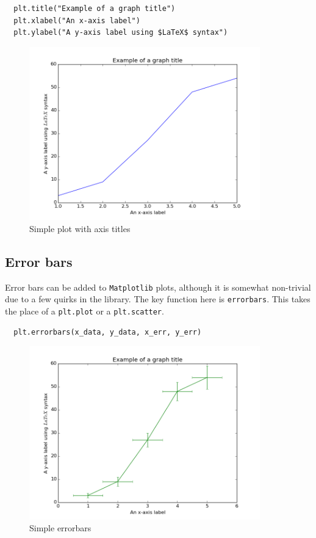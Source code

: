 \documentclass{article}
\begin{document}
\begin{lstlisting}
  plt.title("Example of a graph title")
  plt.xlabel("An x-axis label")
  plt.ylabel("A y-axis label using $LaTeX$ syntax")
\end{lstlisting}

\begin{figure}[H]
  \centering
  \includegraphics[width=10cm]{ch2.png}
  \caption{Simple plot with axis titles}
  \label{fig:ch2}
\end{figure}

\subsection{Error bars}
Error bars can be added to \texttt{Matplotlib} plots, although it is
somewhat non-trivial due to a few quirks in the library. The key
function here is \texttt{errorbars}. This takes the place of a
\texttt{plt.plot} or a \texttt{plt.scatter}.

\begin{lstlisting}
  plt.errorbars(x_data, y_data, x_err, y_err)
\end{lstlisting}

\begin{figure}[H]
  \centering
  \includegraphics[width=10cm]{ch3}
  \caption{Simple errorbars}
  \label{fig:ch3_1}
\end{figure}
\end{document}
